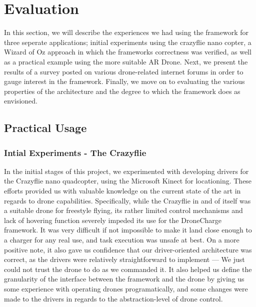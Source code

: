 \section{Evaluation}
In this section, we will describe the experiences we had using the framework for three seperate applications; initial experiments using the crazyflie nano copter, a Wizard of Oz approach in which the frameworks correctness was verified, as well as a practical example using the more suitable AR Drone. Next, we present the results of a survey posted on various drone-related internet forums in order to gauge interest in the framework. Finally, we move on to evaluating the various properties of the architecture and the degree to which the framework does as envisioned.

\subsection{Practical Usage}
\subsubsection{Intial Experiments - The Crazyflie}
In the initial stages of this project, we experimented with developing drivers for the Crazyflie nano quadcopter, using the Microsoft Kinect for locationing. These efforts provided us with valuable knowledge on the current state of the art in regards to drone capabilities. Specifically, while the Crazyflie in and of itself was a suitable drone for freestyle flying, its rather limited control mechanisms and lack of hovering function severely impeded its use for the DroneCharge framework. It was very difficult if not impossible to make it land close enough to a charger for any real use, and task execution was unsafe at best. On a more positive note, it also gave us confidence that our driver-oriented architecture was correct, as the drivers were relatively straightforward to implement --- We just could not trust the drone to do as we commanded it. It also helped us define the granularity of the interface between the framework and the drone by giving us some experience with operating drones programatically, and some changes were made to the drivers in regards to the abstraction-level of drone control.

